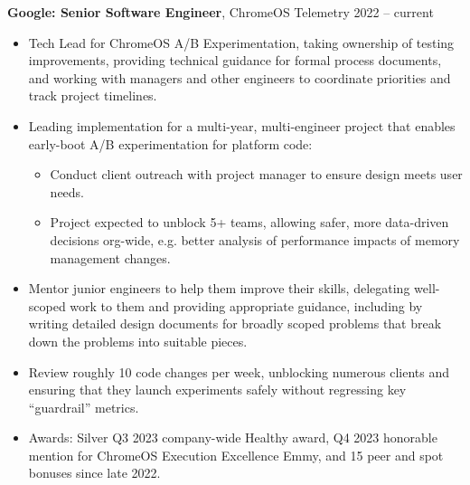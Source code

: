 \documentclass[overlapped]{res}
\newcommand{\experience}[5]{
    \textbf{#3}, #4 \hfill #1 -- #2 \\
    #5
}
\begin{document}
\begin{resume}
  \experience{2022}{current}{Google: Senior Software Engineer}{ChromeOS Telemetry}{
    \begin{itemize} \itemsep -1pt
        \item Tech Lead for ChromeOS A/B Experimentation, taking ownership of
          testing improvements, providing technical guidance for formal process
          documents, and working with managers and other engineers to
          coordinate priorities and track project timelines.
        \item Leading implementation for a multi-year, multi-engineer project
          that enables early-boot A/B experimentation for platform code:
          \vspace{-0.5em}
          \begin{itemize} \itemsep -1pt
              \item Conduct client outreach with project manager to ensure
                design meets user needs.
              \item Project expected to unblock 5+ teams, allowing safer, more
                data-driven decisions org-wide, e.g. better analysis of
                performance impacts of memory management changes.
          \end{itemize}
        \item Mentor junior engineers to help them improve their skills,
          delegating well-scoped work to them and providing appropriate
          guidance, including by writing detailed design documents for broadly
          scoped problems that break down the problems into suitable pieces.
        \item Review roughly 10 code changes per week, unblocking numerous
          clients and ensuring that they launch experiments safely without
          regressing key ``guardrail'' metrics.
        \item Awards: Silver Q3 2023 company-wide Healthy award, Q4 2023
          honorable mention for ChromeOS Execution Excellence Emmy, and 15 peer
          and spot bonuses since late 2022.
    \end{itemize}}


\end{resume}
\end{document}
